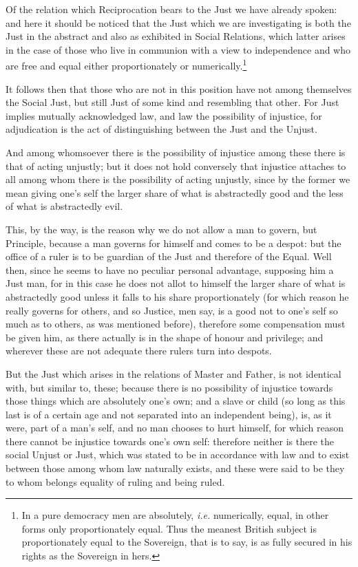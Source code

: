 Of the relation which Reciprocation bears to the Just we have already spoken:
and here it should be noticed that the Just which we are investigating is both
the Just in the abstract and also as exhibited in Social Relations, which
latter arises in the case of those who live in communion with a view to
independence and who are free and equal either proportionately or
numerically.\footnote{In a pure democracy men are absolutely, \emph{i.e.} numerically, equal, in
other forms only proportionately equal. Thus the meanest British subject is
proportionately equal to the Sovereign, that is to say, is as fully secured in
his rights as the Sovereign in hers.}

It follows then that those who are not in this position have not among
themselves the Social Just, but still Just of some kind and resembling that
other. For Just implies mutually acknowledged law, and law the possibility of
injustice, for adjudication is the act of distinguishing between the Just and
the Unjust.

And among whomsoever there is the possibility of injustice among these there is
that of acting unjustly; but it does not hold conversely that injustice
attaches to all among whom there is the possibility of acting unjustly, since
by the former we mean giving one’s self the larger share of what is
abstractedly good and the less of what is abstractedly evil.

This, by the way, is the reason why we do not allow a man to govern, but
Principle, because a man governs for himself and comes to be a despot: but the
office of a ruler is to be guardian of the Just and therefore of the Equal.
Well then, since he seems to have no peculiar personal advantage, supposing him
a Just man, for in this case he does not allot to himself the larger share of
what is abstractedly good unless it falls to his share proportionately (for
which reason he really governs for others, and so Justice, men say, is a good
not to one’s self so much as to others, as was mentioned before),
therefore some compensation must be given him, as there actually is in the
shape of honour and privilege; and wherever these are not adequate there rulers
turn into despots.

But the Just which arises in the relations of Master and Father, is not
identical with, but similar to, these; because there is no possibility of
injustice towards those things which are absolutely one’s own; and a
slave or child (so long as this last is of a certain age and not separated into
an independent being), is, as it were, part of a man’s self, and no man
chooses to hurt himself, for which reason there cannot be injustice towards
one’s own self: therefore neither is there the social Unjust or Just,
which was stated to be in accordance with law and to exist between those among
whom law naturally exists, and these were said to be they to whom belongs
equality of ruling and being ruled.

